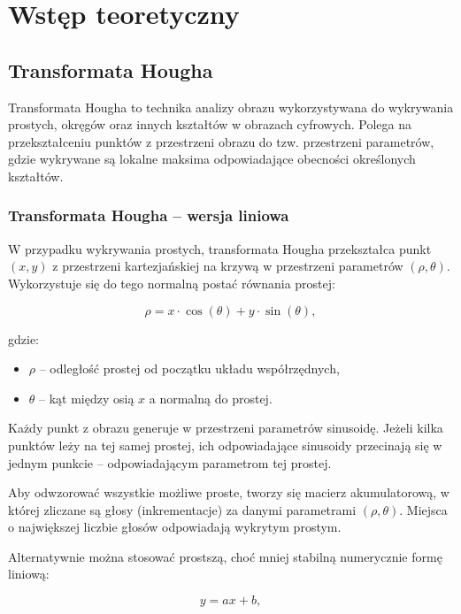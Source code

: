 \section{Wstęp teoretyczny}

\subsection{Transformata Hougha}

Transformata Hougha to technika analizy obrazu wykorzystywana do wykrywania prostych, okręgów oraz innych kształtów w obrazach cyfrowych. Polega na przekształceniu punktów z przestrzeni obrazu do tzw. przestrzeni parametrów, gdzie wykrywane są lokalne maksima odpowiadające obecności określonych kształtów.

\subsubsection{Transformata Hougha – wersja liniowa}

W przypadku wykrywania prostych, transformata Hougha przekształca punkt $(x, y)$ z przestrzeni kartezjańskiej na krzywą w przestrzeni parametrów $(\rho, \theta)$. Wykorzystuje się do tego normalną postać równania prostej:

\begin{equation}
	\rho = x \cdot \cos(\theta) + y \cdot \sin(\theta),
\end{equation}

gdzie:
\begin{itemize}
	\item $\rho$ – odległość prostej od początku układu współrzędnych,
	\item $\theta$ – kąt między osią $x$ a normalną do prostej.
\end{itemize}

Każdy punkt z obrazu generuje w przestrzeni parametrów sinusoidę. Jeżeli kilka punktów leży na tej samej prostej, ich odpowiadające sinusoidy przecinają się w jednym punkcie – odpowiadającym parametrom tej prostej.

Aby odwzorować wszystkie możliwe proste, tworzy się macierz akumulatorową, w której zliczane są głosy (inkrementacje) za danymi parametrami $(\rho, \theta)$. Miejsca o największej liczbie głosów odpowiadają wykrytym prostym.

Alternatywnie można stosować prostszą, choć mniej stabilną numerycznie formę liniową:

\begin{equation}
	y = ax + b,
\end{equation}

